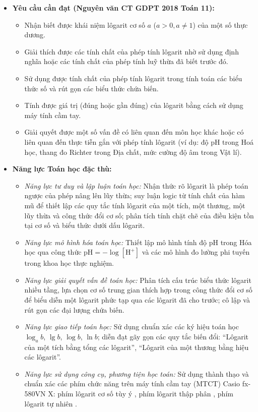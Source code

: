 \documentclass[12pt, a4paper]{article}
\begin{document}
\begin{itemize}[leftmargin=1.2cm]
    \item \textbf{Yêu cầu cần đạt (Nguyên văn CT GDPT 2018 Toán 11):}
    \begin{itemize}[leftmargin=0.6cm]
        \item Nhận biết được khái niệm lôgarit cơ số $a$ ($a > 0, a \neq 1$) của một số thực dương.
        \item Giải thích được các tính chất của phép tính lôgarit nhờ sử dụng định nghĩa hoặc các tính chất của phép tính luỹ thừa đã biết trước đó.
        \item Sử dụng được tính chất của phép tính lôgarit trong tính toán các biểu thức số và rút gọn các biểu thức chứa biến.
        \item Tính được giá trị (đúng hoặc gần đúng) của lôgarit bằng cách sử dụng máy tính cầm tay.
        \item Giải quyết được một số vấn đề có liên quan đến môn học khác hoặc có liên quan đến thực tiễn gắn với phép tính lôgarit (ví dụ: độ pH trong Hoá học, thang đo Richter trong Địa chất, mức cường độ âm trong Vật lí).
    \end{itemize}

    \item \textbf{Năng lực Toán học đặc thù:}
    \begin{itemize}[leftmargin=0.6cm]
        \item \textit{Năng lực tư duy và lập luận toán học:} Nhận thức rõ lôgarit là phép toán ngược của phép nâng lên lũy thừa; suy luận logic từ tính chất của hàm mũ để thiết lập các quy tắc tính lôgarit của một tích, một thương, một lũy thừa và công thức đổi cơ số; phân tích tính chặt chẽ của điều kiện tồn tại cơ số và biểu thức dưới dấu lôgarit.
        \item \textit{Năng lực mô hình hóa toán học:} Thiết lập mô hình tính độ pH trong Hóa học qua công thức $\text{pH} = -\log[\text{H}^+]$ và các mô hình đo lường phi tuyến trong khoa học thực nghiệm.
        \item \textit{Năng lực giải quyết vấn đề toán học:} Phân tích cấu trúc biểu thức lôgarit nhiều tầng, lựa chọn cơ số trung gian thích hợp trong công thức đổi cơ số để biểu diễn một lôgarit phức tạp qua các lôgarit đã cho trước; cô lập và rút gọn các đại lượng chứa biến.
        \item \textit{Năng lực giao tiếp toán học:} Sử dụng chuẩn xác các ký hiệu toán học $\log_a b$, $\lg b$, $\log b$, $\ln b$; diễn đạt gãy gọn các quy tắc biến đổi: ``Lôgarit của một tích bằng tổng các lôgarit'', ``Lôgarit của một thương bằng hiệu các lôgarit''.
        \item \textit{Năng lực sử dụng công cụ, phương tiện học toán:} Sử dụng thành thạo và chuẩn xác các phím chức năng trên máy tính cầm tay (MTCT) Casio fx-580VN X: phím lôgarit cơ số tùy ý \fbox{$\log_\blacksquare\blacksquare$}, phím lôgarit thập phân \fbox{$\log$}, phím lôgarit tự nhiên \fbox{$\ln$}.
    \end{itemize}


\end{itemize}
\end{document}
